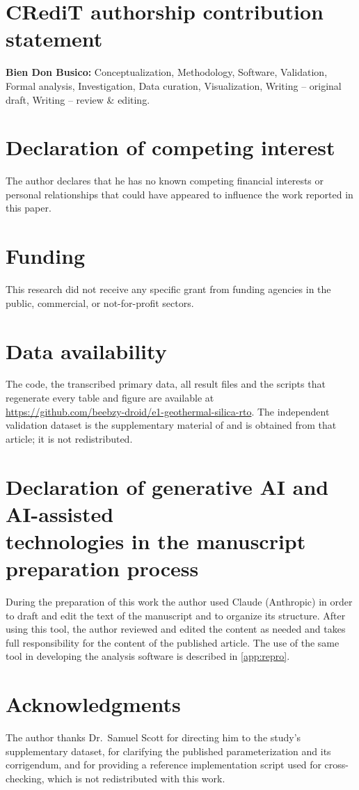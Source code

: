 \section*{CRediT authorship contribution statement}
\textbf{Bien Don Busico:} Conceptualization, Methodology, Software,
Validation, Formal analysis, Investigation, Data curation,
Visualization, Writing -- original draft, Writing -- review \& editing.

\section*{Declaration of competing interest}
The author declares that he has no known competing financial interests
or personal relationships that could have appeared to influence the
work reported in this paper.

\section*{Funding}
This research did not receive any specific grant from funding agencies
in the public, commercial, or not-for-profit sectors.

\section*{Data availability}
The code, the transcribed primary data, all result files and the
scripts that regenerate every table and figure are available at\\
\url{https://github.com/beebzy-droid/e1-geothermal-silica-rto}. The
independent validation dataset is the supplementary material of
\citet{scott2024silica} and is obtained from that article; it is not
redistributed.

\section*{Declaration of generative AI and AI-assisted\\ technologies in the manuscript preparation process}
During the preparation of this work the author used Claude (Anthropic)
in order to draft and edit the text of the manuscript and to organize
its structure. After using this tool, the author reviewed and edited
the content as needed and takes full responsibility for the content of
the published article. The use of the same tool in developing the
analysis software is described in \ref{app:repro}.

\section*{Acknowledgments}
The author thanks Dr.~Samuel Scott for directing him to the study's
supplementary dataset, for clarifying the published parameterization
and its corrigendum, and for providing a reference implementation
script used for cross-checking, which is not redistributed with this
work.
